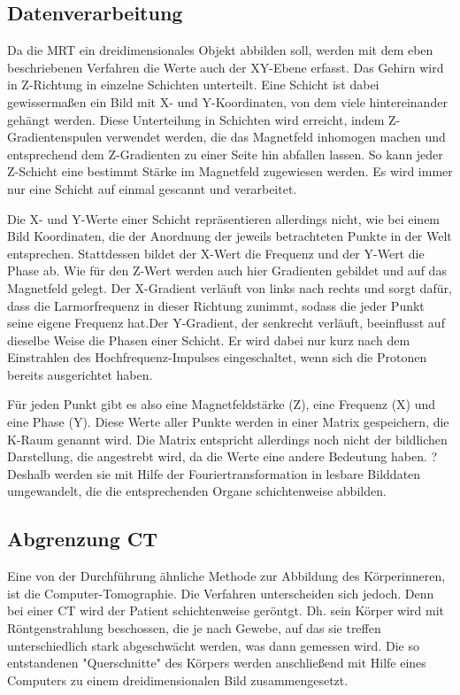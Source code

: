 \subsection{Datenverarbeitung}

Da die MRT ein dreidimensionales Objekt abbilden soll, werden mit dem eben beschriebenen Verfahren die Werte auch der XY-Ebene erfasst. Das Gehirn wird in Z-Richtung in einzelne Schichten unterteilt. Eine Schicht ist dabei gewissermaßen ein Bild mit X- und Y-Koordinaten, von dem viele hintereinander gehängt werden. Diese Unterteilung in Schichten wird erreicht, indem Z-Gradientenspulen verwendet werden, die das Magnetfeld inhomogen machen und entsprechend dem Z-Gradienten zu einer Seite hin abfallen lassen. So kann jeder Z-Schicht eine bestimmt Stärke im Magnetfeld zugewiesen werden. 
Es wird immer nur eine Schicht auf einmal gescannt und verarbeitet.

Die X- und Y-Werte einer Schicht repräsentieren allerdings nicht, wie bei einem Bild Koordinaten, die der Anordnung der jeweils betrachteten Punkte in der Welt entsprechen. Stattdessen bildet der X-Wert die Frequenz und der Y-Wert die Phase ab. Wie für den Z-Wert werden auch hier Gradienten gebildet und auf das Magnetfeld gelegt. Der X-Gradient verläuft von links nach rechts und sorgt dafür, dass die Larmorfrequenz in dieser Richtung zunimmt, sodass die jeder Punkt seine eigene Frequenz hat.Der Y-Gradient, der senkrecht verläuft, beeinflusst auf dieselbe Weise die Phasen einer Schicht. Er wird dabei nur kurz nach dem Einstrahlen des Hochfrequenz-Impulses eingeschaltet, wenn sich die Protonen bereits ausgerichtet haben.

Für jeden Punkt gibt es also eine Magnetfeldstärke (Z), eine Frequenz (X) und eine Phase (Y). Diese Werte aller Punkte werden in einer Matrix gespeichern, die K-Raum genannt wird. Die Matrix entspricht allerdings noch nicht der bildlichen Darstellung, die angestrebt wird, da die Werte eine andere Bedeutung haben. ? Deshalb werden sie mit Hilfe der Fouriertransformation in lesbare Bilddaten umgewandelt, die die entsprechenden Organe schichtenweise abbilden. 

\subsection{Abgrenzung CT}
Eine von der Durchführung ähnliche Methode zur Abbildung des Körperinneren, ist die Computer-Tomographie. Die Verfahren unterscheiden sich jedoch. Denn bei einer CT wird der Patient schichtenweise geröntgt. Dh. sein Körper wird mit Röntgenstrahlung beschossen, die je nach Gewebe, auf das sie treffen unterschiedlich stark abgeschwächt werden, was dann gemessen wird. Die so entstandenen "Querschnitte" des Körpers werden anschließend mit Hilfe eines Computers zu einem dreidimensionalen Bild zusammengesetzt. 

